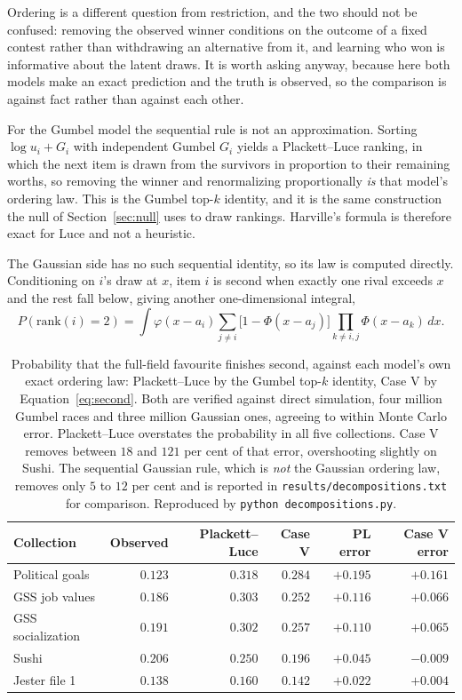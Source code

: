 \documentclass[11pt]{article}
\begin{document}
Ordering is a different question from restriction, and the two should not be confused: removing
the observed winner conditions on the outcome of a fixed contest rather than withdrawing an
alternative from it, and learning who won is informative about the latent draws. It is worth
asking anyway, because here both models make an exact prediction and the truth is observed, so
the comparison is against fact rather than against each other.

For the Gumbel model the sequential rule is not an approximation. Sorting
$\log u_i + G_i$ with independent Gumbel $G_i$ yields a Plackett--Luce ranking, in which the next
item is drawn from the survivors in proportion to their remaining worths, so removing the winner
and renormalizing proportionally \emph{is} that model's ordering law. This is the Gumbel top-$k$
identity, and it is the same construction the null of Section~\ref{sec:null} uses to draw
rankings. Harville's formula is therefore exact for Luce and not a heuristic.

The Gaussian side has no such sequential identity, so its law is computed directly. Conditioning
on $i$'s draw at $x$, item $i$ is second when exactly one rival exceeds $x$ and the rest fall
below, giving another one-dimensional integral,
\begin{equation}
P(\mathrm{rank}(i) = 2) = \int \varphi(x - a_i)
  \sum_{j \neq i} \bigl[1 - \Phi(x - a_j)\bigr]
  \prod_{k \neq i,j} \Phi(x - a_k)\, dx .
\label{eq:second}
\end{equation}

\begin{table}[ht]
\centering
\small
\begin{tabular}{lrrrrr}
\toprule
Collection & Observed & Plackett--Luce & Case V & PL error & Case V error \\
\midrule
Political goals & $0.123$ & $0.318$ & $0.284$ & $+0.195$ & $+0.161$ \\
GSS job values & $0.186$ & $0.303$ & $0.252$ & $+0.116$ & $+0.066$ \\
GSS socialization & $0.191$ & $0.302$ & $0.257$ & $+0.110$ & $+0.065$ \\
Sushi & $0.206$ & $0.250$ & $0.196$ & $+0.045$ & $-0.009$ \\
Jester file 1 & $0.138$ & $0.160$ & $0.142$ & $+0.022$ & $+0.004$ \\
\bottomrule
\end{tabular}
\caption{Probability that the full-field favourite finishes second, against each model's own
exact ordering law: Plackett--Luce by the Gumbel top-$k$ identity, Case V by
Equation~\eqref{eq:second}. Both are verified against direct simulation, four million Gumbel
races and three million Gaussian ones, agreeing to within Monte Carlo error. Plackett--Luce
overstates the probability in all five collections. Case V removes between $18$ and $121$ per
cent of that error, overshooting slightly on Sushi. The sequential Gaussian rule, which is
\emph{not} the Gaussian ordering law, removes only $5$ to $12$ per cent and is reported in
\texttt{results/decompositions.txt} for comparison. Reproduced by
\texttt{python decompositions.py}.}
\label{tab:favsecond}
\end{table}
\end{document}
